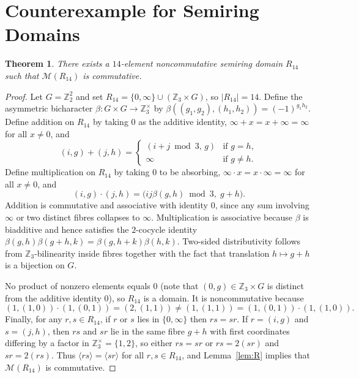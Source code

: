 \documentclass[11pt]{article}
\newtheorem{theorem}{Theorem}
\theoremstyle{remark}
\begin{document}
\section{Counterexample for Semiring Domains}

\begin{theorem}\label{thm:B}
There exists a $14$-element noncommutative semiring domain $R_{14}$ such that $\mathcal{M}(R_{14})$ is commutative.
\end{theorem}

\begin{proof}
Let $G = \mathbb{Z}_2^2$ and set $R_{14} = \{0, \infty\} \cup (\mathbb{Z}_3 \times G)$, so $|R_{14}| = 14$. Define the asymmetric bicharacter $\beta : G \times G \to \mathbb{Z}_3^\times$ by $\beta((g_1, g_2), (h_1, h_2)) = (-1)^{g_1 h_2}$. Define addition on $R_{14}$ by taking $0$ as the additive identity, $\infty + x = x + \infty = \infty$ for all $x \ne 0$, and
\[
  (i, g) + (j, h) = \begin{cases} (i + j \bmod 3,\, g) & \text{if } g = h, \\ \infty & \text{if } g \ne h. \end{cases}
\]
Define multiplication on $R_{14}$ by taking $0$ to be absorbing, $\infty \cdot x = x \cdot \infty = \infty$ for all $x \ne 0$, and
\[
  (i, g) \cdot (j, h) = \bigl(ij\beta(g, h) \bmod 3,\; g + h\bigr).
\]
Addition is commutative and associative with identity $0$, since any sum involving $\infty$ or two distinct fibres collapses to $\infty$. Multiplication is associative because $\beta$ is biadditive and hence satisfies the $2$-cocycle identity $\beta(g,h)\beta(g+h,k) = \beta(g,h+k)\beta(h,k)$. Two-sided distributivity follows from $\mathbb{Z}_3$-bilinearity inside fibres together with the fact that translation $h \mapsto g + h$ is a bijection on $G$.

No product of nonzero elements equals $0$ (note that $(0,g) \in \mathbb{Z}_3 \times G$ is distinct from the additive identity $0$), so $R_{14}$ is a domain. It is noncommutative because
\[
  (1, (1,0)) \cdot (1, (0,1)) = (2, (1,1)) \ne (1, (1,1)) = (1, (0,1)) \cdot (1, (1,0)).
\]
Finally, for any $r, s \in R_{14}$, if $r$ or $s$ lies in $\{0,\infty\}$ then $rs = sr$. If $r = (i, g)$ and $s = (j, h)$, then $rs$ and $sr$ lie in the same fibre $g + h$ with first coordinates differing by a factor in $\mathbb{Z}_3^\times = \{1, 2\}$, so either $rs = sr$ or $rs = 2(sr)$ and $sr = 2(rs)$. Thus $\langle rs \rangle = \langle sr \rangle$ for all $r, s \in R_{14}$, and Lemma~\ref{lem:R} implies that $\mathcal{M}(R_{14})$ is commutative.
\end{proof}
\end{document}
